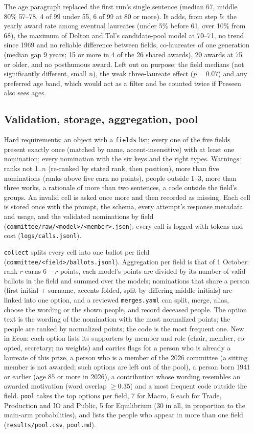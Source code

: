 \documentclass[11pt,a4paper]{article}
\newcommand{\code}[1]{\texttt{#1}}
\begin{document}
The age paragraph replaced the first run's single sentence (median 67, middle 80\% 57--78, 4 of 99 under 55, 6 of 99 at
80 or more). It adds, from step 5: the yearly award rate among eventual laureates (under 5\% before 61, over 10\% from
68), the maximum of Dolton and Tol's candidate-pool model at 70--71, no trend since 1969 and no reliable difference
between fields, co-laureates of one generation (median gap 9 years; 15 or more in 4 of the 26 shared awards), 20 awards
at 75 or older, and no posthumous award. Left out on purpose: the field medians (not significantly different, small
$n$), the weak three-laureate effect ($p = 0.07$) and any preferred age band, which would act as a filter and be counted
twice if Preseen also sees ages.

\subsection{Validation, storage, aggregation, pool}

Hard requirements: an object with a \code{fields} list; every one of the five fields present exactly once (matched by
name, accent-insensitive) with at least one nomination; every nomination with the six keys and the right types.
Warnings: ranks not 1..$n$ (re-ranked by stated rank, then position), more than five nominations (ranks above five earn
no points), people outside 1--3, more than three works, a rationale of more than two sentences, a code outside the
field's groups. An invalid cell is asked once more and then recorded as missing. Each cell is stored once with the
prompt, the schema, every attempt's response metadata and usage, and the validated nominations by field
(\code{committee/raw/<model>/<member>.json}); every call is logged with tokens and cost (\code{logs/calls.jsonl}).

\code{collect} splits every cell into one ballot per field (\code{committee/<field>/ballots.jsonl}). Aggregation per
field is that of 1 October: rank $r$ earns $6-r$ points, each model's points are divided by its number of valid
ballots in the field and summed over the models; nominations that share a person (first initial + surname, accents
folded, split by differing middle initials) are linked into one option, and a reviewed \code{merges.yaml} can split,
merge, alias, choose the wording or the shown people, and record deceased people. The option text is the wording of
the nomination with the most normalized points; the people are ranked by normalized points; the code is the most
frequent one. New in Econ: each option lists its supporters by member and role (chair, member, co-opted, secretary;
no weights) and carries flags for a person who is already a laureate of this prize, a person who is a member of the
2026 committee (a sitting member is not awarded; such options are left out of the pool), a person born 1941 or earlier
(age 85 or more in 2026), a contribution whose wording resembles an awarded motivation (word overlap $\geq 0.35$) and a
most frequent code outside the field. \code{pool} takes the top options per field, 7 for Macro, 6 each for Trade,
Production and IO and Public, 5 for Equilibrium (30 in all, in proportion to the main-arm probabilities), and lists the
people who appear in more than one field (\code{results/pool.csv}, \code{pool.md}).
\end{document}
